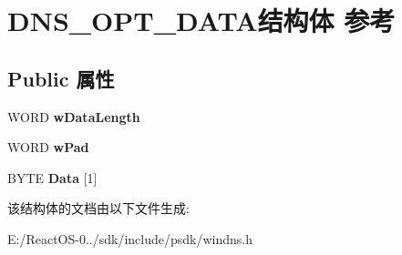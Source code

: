\hypertarget{struct_d_n_s___o_p_t___d_a_t_a}{}\section{D\+N\+S\+\_\+\+O\+P\+T\+\_\+\+D\+A\+T\+A结构体 参考}
\label{struct_d_n_s___o_p_t___d_a_t_a}
\subsection*{Public 属性}
\begin{DoxyCompactItemize}
\item 
\mbox{\label{struct_d_n_s___o_p_t___d_a_t_a_a60fdf397b2e0fac963ba3181ee7c3ac7}} 
W\+O\+RD {\bfseries w\+Data\+Length}
\item 
\mbox{\label{struct_d_n_s___o_p_t___d_a_t_a_a5464d046f4e2b29d27506ce1d643d6cd}} 
W\+O\+RD {\bfseries w\+Pad}
\item 
\mbox{\label{struct_d_n_s___o_p_t___d_a_t_a_a469a72c2f78766a13c1c02b747fe31f9}} 
B\+Y\+TE {\bfseries Data} \mbox{[}1\mbox{]}
\end{DoxyCompactItemize}


该结构体的文档由以下文件生成\+:\begin{DoxyCompactItemize}
\item 
E\+:/\+React\+O\+S-\/0../sdk/include/psdk/windns.\+h\end{DoxyCompactItemize}
